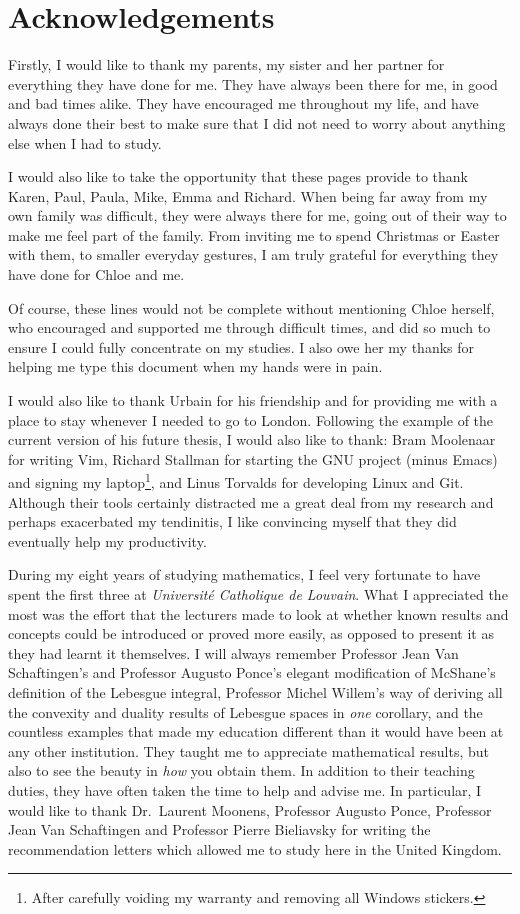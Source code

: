 \chapter*{Acknowledgements}

Firstly, I would like to thank my parents, my sister and her partner for everything they have done for me.
They have always been there for me,
in good and bad times alike.
They have encouraged me throughout my life,
and have always done their best to make sure that I did not need to worry about anything else when I had to study.

I would also like to take the opportunity that these pages provide to thank Karen, Paul, Paula, Mike, Emma and Richard.
When being far away from my own family was difficult,
they were always there for me, going out of their way to make me feel part of the family.
From inviting me to spend Christmas or Easter with them,
to smaller everyday gestures,
I am truly grateful for everything they have done for Chloe and me.

Of course,
these lines would not be complete without mentioning Chloe herself, who encouraged and supported me through difficult times,
and did so much to ensure I could fully concentrate on my studies.
I also owe her my thanks for helping me type this document
when my hands were in pain.

I would also like to thank Urbain for his friendship and for providing me with a place to stay whenever I needed to go to London.
Following the example of the current version of his future thesis,
I would also like to thank:
Bram Moolenaar for writing Vim,
Richard Stallman for starting the GNU project (minus Emacs) and signing my laptop\footnote{After carefully voiding my warranty and removing all Windows stickers.},
and Linus Torvalds for developing Linux and Git.
Although their tools certainly distracted me a great deal from my research
and perhaps exacerbated my tendinitis,
I like convincing myself that they did eventually help my productivity.

During my eight years of studying mathematics,
I feel very fortunate to have spent the first three at \emph{Universit\'e Catholique de Louvain}.
What I appreciated the most was the effort that the lecturers made to look at
whether known results and concepts could be introduced or proved more easily,
as opposed to present it as they had learnt it themselves.
I will always remember Professor Jean Van Schaftingen's and Professor Augusto Ponce's elegant modification of McShane's definition of the Lebesgue integral,
Professor Michel Willem's way of deriving all the convexity and duality results of Lebesgue spaces in \emph{one} corollary,
and the countless examples that made my education different than it would have been at any other institution.
They taught me to appreciate mathematical results,
but also to see the beauty in \emph{how} you obtain them.
In addition to their teaching duties,
they have often taken the time to help and advise me.
In particular,
I would like to thank Dr.\ Laurent Moonens,
Professor Augusto Ponce, Professor Jean Van Schaftingen and Professor Pierre Bieliavsky for writing the recommendation letters which allowed me to study here in the United Kingdom.

